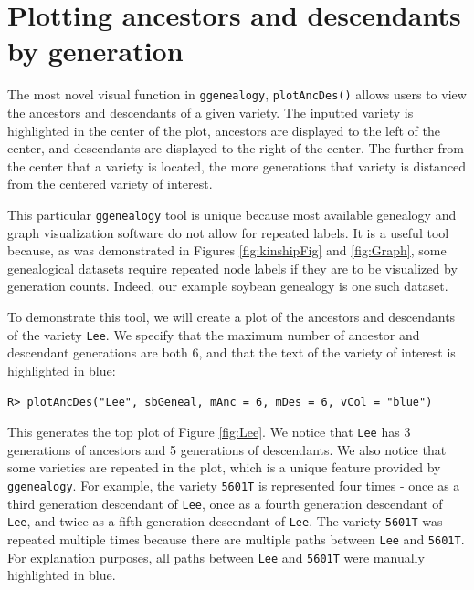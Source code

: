 \documentclass[11pt,a4paper,oldfontcommands,openany]{memoir}
\DeclareRobustCommand{\mybox}[2][gray!15]{%
\begin{tcolorbox}[   %
        breakable,
        left=0pt,
        right=0pt,
        top=0pt,
        bottom=0pt,
        colback=#1,
        colframe=#1,
        width=\dimexpr\textwidth\relax, 
        enlarge left by=0mm,
        boxsep=5pt,
        arc=0pt,outer arc=0pt,
        ]
        #2
\end{tcolorbox}
}
\numberwithin{equation}{section} %
\newcommand{\code}[1]{{\texttt{#1}}}
\newcommand{\pkg}[1]{{\texttt{#1}}}
\begin{document}
\section{Plotting ancestors and descendants by generation}
\label{remedy}

The most novel visual function in \pkg{ggenealogy}, \code{plotAncDes()} allows users to view the ancestors and descendants of a given variety. The inputted variety is highlighted in the center of the plot, ancestors are displayed to the left of the center, and descendants are displayed to the right of the center. The further from the center that a variety is located, the more generations that variety is distanced from the centered variety of interest.

This particular \pkg{ggenealogy} tool is unique because most available genealogy and graph visualization software do not allow for repeated labels. It is a useful tool because, as was demonstrated in Figures \ref{fig:kinshipFig} and \ref{fig:Graph}, some genealogical datasets require repeated node labels if they are to be visualized by generation counts. Indeed, our example soybean genealogy is one such dataset.

To demonstrate this tool, we will create a plot of the ancestors and descendants of the variety \code{Lee}. We specify that the maximum number of ancestor and descendant generations are both 6, and that the text of the variety of interest is highlighted in blue:

\mybox{
\texttt{R> plotAncDes("Lee", sbGeneal, mAnc = 6, mDes = 6, vCol = "blue")}
}

This generates the top plot of Figure \ref{fig:Lee}. We notice that \code{Lee} has 3 generations of ancestors and 5 generations of descendants. We also notice that some varieties are repeated in the plot, which is a unique feature provided by \pkg{ggenealogy}. For example, the variety \code{5601T} is represented four times - once as a third generation descendant of \code{Lee}, once as a fourth generation descendant of \code{Lee}, and twice as a fifth generation descendant of \code{Lee}. The variety \code{5601T} was repeated multiple times because there are multiple paths between \code{Lee} and \code{5601T}. For explanation purposes, all paths between \code{Lee} and \code{5601T} were manually highlighted in blue.
\end{document}
